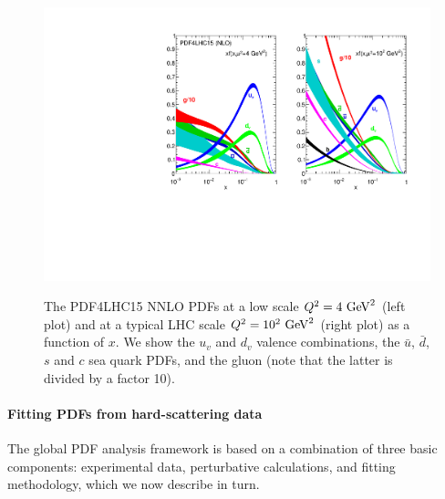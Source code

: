 \begin{figure}[t]
\begin{center}
  \includegraphics[scale=0.8]{plots/PDF4LHC15.pdf}\\
  \caption{\small The PDF4LHC15 NNLO PDFs at a low scale
    $Q^2=4~{\rm GeV}^2$ (left plot) and at a typical LHC scale
    $Q^2=10^2~{\rm GeV}^2$ (right plot) as a function of $x$.
    We show the $u_v$ and $d_v$ valence combinations, the $\bar{u}$,
    $\bar{d}$, $s$ and $c$ sea quark PDFs, and the gluon (note that
    the latter is divided by a factor 10).
    \label{fig:nnlopdfs}
  }
\end{center}
\end{figure}


\paragraph*{Fitting PDFs from hard-scattering data}
%
The global PDF analysis framework is based on a combination of three basic components: experimental
data, perturbative calculations, and fitting methodology, which we now describe
in turn.

